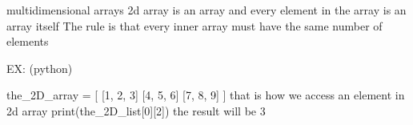 multidimensional arrays 
  2d array is an array and every element in the array is an array itself 
  The rule is that every inner array must have the same number of elements
  
  EX:   (python)

    the_2D_array = [
        [1, 2, 3]
        [4, 5, 6]
        [7, 8, 9]
    ]
  that is how  we access an element in 2d array
    print(the_2D_list[0][2])
    the result will be 3